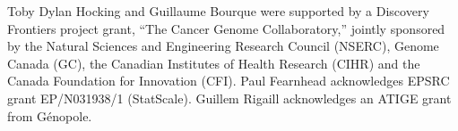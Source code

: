 \documentclass[twoside,11pt]{article}
\begin{document}
Toby Dylan Hocking and Guillaume Bourque were supported by a Discovery
Frontiers project grant, ``The Cancer Genome Collaboratory,'' jointly
sponsored by the Natural Sciences and Engineering Research Council
(NSERC), Genome Canada (GC), the Canadian Institutes of Health
Research (CIHR) and the Canada Foundation for Innovation (CFI). Paul
Fearnhead acknowledges EPSRC grant EP/N031938/1 (StatScale).
Guillem Rigaill acknowledges an ATIGE  grant from G\'enopole.


 
%

 


\end{document}
